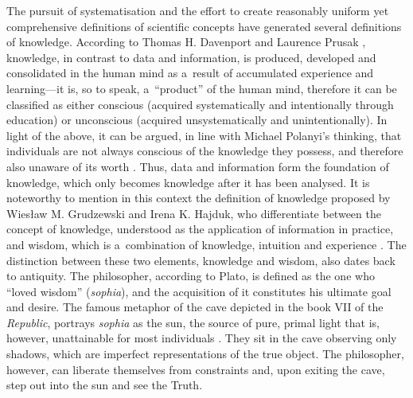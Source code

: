 The pursuit of systematisation and the effort to create reasonably uniform yet comprehensive definitions of scientific concepts have generated several definitions of knowledge. According to Thomas H. Davenport and Laurence Prusak 
\parencite*[][]{}, %
 knowledge, in contrast to data and information, is produced, developed and consolidated in the human mind as a~result of accumulated experience and learning---it is, so to speak, a~``product'' of the human mind, therefore it can be classified as either conscious (acquired systematically and intentionally through education) or unconscious (acquired unsystematically and unintentionally). In light of the above, it can be argued, in line with Michael Polanyi's thinking, that individuals are not always conscious of the knowledge they possess, and therefore also unaware of its worth 
\parencite[][p.37]{polanyi_tacit_1966}. %
 Thus, data and information form the foundation of knowledge, which only becomes knowledge after it has been analysed. It is noteworthy to mention in this context the definition of knowledge proposed by Wiesław M. Grudzewski and Irena K. Hajduk, who differentiate between the concept of knowledge, understood as the application of information in practice, and wisdom, which is a~combination of knowledge, intuition and experience 
\parencite[][p.73]{grudzewski_zarzadzanie_2004}. %
 The distinction between these two elements, knowledge and wisdom, also dates back to antiquity. The philosopher, according to Plato, is defined as the one who ``loved wisdom'' (\textit{sophia}), and the acquisition of it constitutes his ultimate goal and desire. The famous metaphor of the cave depicted in the book VII of the \textit{Republic}, portrays \textit{sophia} as the sun, the source of pure, primal light that is, however, unattainable for most individuals 
\parencite[][]{}. %
 They sit in the cave observing only shadows, which are imperfect representations of the true object. The philosopher, however, can liberate themselves from constraints and, upon exiting the cave, step out into the sun and see the Truth.



